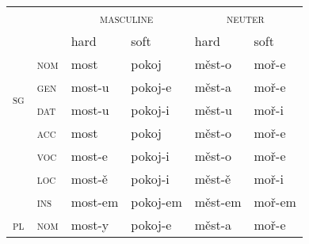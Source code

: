 \documentclass[output=paper]{langsci/langscibook}
\begin{document}
\begin{table}[htb]
\centering\smaller
\begin{tabular}{ll|ll|ll}
\lsptoprule
& & \multicolumn{2}{c}{\scshape masculine} &  \multicolumn{2}{c}{\scshape neuter}\\
& & hard &   soft & hard &  soft\\
\midrule
\multirow{4}{*}{\scshape sg} & \scshape nom & most & pokoj  &  měst-o & moř-e\\
& \scshape gen & most-u &  pokoj-e &  měst-a &  moř-e\\
& \scshape dat & most-u &  pokoj-i & měst-u &  moř-i\\
& \scshape acc & most &  pokoj &  měst-o &  moř-e\\
& \scshape voc & most-e & pokoj-i & měst-o & moř-e\\
& \scshape loc & most-ě & pokoj-i & měst-ě & moř-i\\
& \scshape ins & most-em & pokoj-em & měst-em & moř-em\\
\midrule
\multirow{4}{*}{\scshape pl} & \scshape nom & most-y &  pokoj-e &   měst-a &  moř-e\\

\end{tabular}
\end{table}
\end{document}

